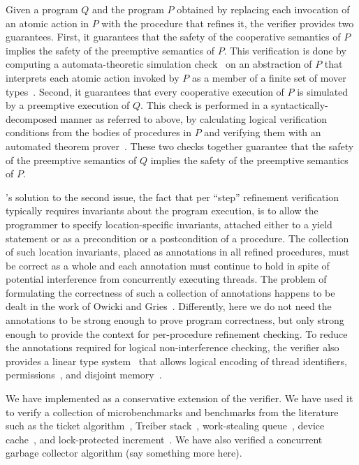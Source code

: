 Given a program $Q$ and the program $P$ obtained by replacing each invocation of an atomic action in $P$ 
with the procedure that refines it, the \civl verifier provides two guarantees.
First, it guarantees that the safety of the cooperative semantics of $P$ implies the safety of the preemptive semantics of $P$.
This verification is done by computing a automata-theoretic simulation check~\cite{HenzingerHK95} 
on an abstraction of $P$ that interprets each atomic action invoked by $P$ 
as a member of a finite set of mover types~\cite{Lipton75,FlanaganFLQ08}.
Second, it guarantees that every cooperative execution of $P$ is simulated by a preemptive execution of $Q$.
This check is performed in a syntactically-decomposed manner as referred to above, by calculating logical verification conditions from the bodies of procedures in $P$ and 
verifying them with an automated theorem prover~\cite{MouraB08}.
These two checks together guarantee that the 
safety of the preemptive semantics of $Q$ implies the safety of the preemptive semantics of $P$.

\civl's solution to the second issue, the fact that per ``step'' refinement verification typically requires invariants about the program execution, is to allow the programmer to specify location-specific invariants, attached either to a yield statement
or as a precondition or a postcondition of a procedure. 
The collection of such location invariants, placed as annotations in all refined procedures, must be correct as a whole and each  annotation must continue to hold in spite of potential interference from concurrently executing threads.
The problem of formulating the correctness of such a collection of annotations happens to be dealt in the work of Owicki and Gries~\cite{OwickiG76}. Differently, here we do not need the annotations to be strong enough to prove program correctness, but only strong enough to provide the context for per-procedure refinement checking. 
To reduce the annotations required for logical non-interference checking, 
the \civl verifier also provides a linear type system~\cite{Wadler90lineartypes} 
that allows logical encoding of thread identifiers, permissions~\cite{boyland:03fractions}, 
and disjoint memory~\cite{LahiriQW11}.

We have implemented \civl as a conservative extension of the \boogie verifier.  
We have used it to verify a collection of microbenchmarks and benchmarks from the literature such as
the ticket algorithm~\cite{ticket}, Treiber stack~\cite{treiber}, work-stealing queue~\cite{wsq},
device cache~\cite{device-cache}, and lock-protected increment~\cite{incr}.
We have also verified a concurrent garbage collector algorithm (say something more here).

